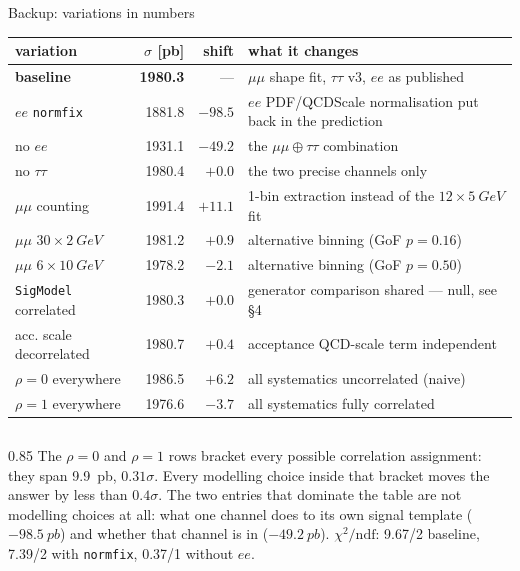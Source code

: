 \documentclass[aspectratio=169,9pt,t]{beamer}
\begin{document}
\begin{frame}[noframenumbering]{Backup: variations in numbers}
\centering\small
\begin{tabular}{@{}lrrl@{}}
\toprule
variation & $\sigma$ [pb] & shift & what it changes \\ \midrule
\textbf{baseline} & \textbf{1980.3} & --- & $\mu\mu$ shape fit, $\tau\tau$ v3, $ee$ as published \\
\alert{$ee$ \texttt{normfix}} & \alert{1881.8} & \alert{$-98.5$} & \alert{$ee$ PDF/QCDScale normalisation put back in the prediction} \\
no $ee$ & 1931.1 & $-49.2$ & the $\mu\mu \oplus \tau\tau$ combination \\
no $\tau\tau$ & 1980.4 & $+0.0$ & the two precise channels only \\
$\mu\mu$ counting & 1991.4 & $+11.1$ & 1-bin extraction instead of the $12\times\SI{5}{GeV}$ fit \\
$\mu\mu$ $30\times\SI{2}{GeV}$ & 1981.2 & $+0.9$ & alternative binning (GoF $p = 0.16$) \\
$\mu\mu$ $6\times\SI{10}{GeV}$ & 1978.2 & $-2.1$ & alternative binning (GoF $p = 0.50$) \\
\texttt{SigModel} correlated & 1980.3 & $+0.0$ & generator comparison shared --- null, see \S4 \\
acc. scale decorrelated & 1980.7 & $+0.4$ & acceptance QCD-scale term independent \\
$\rho = 0$ everywhere & 1986.5 & $+6.2$ & all systematics uncorrelated (naive) \\
$\rho = 1$ everywhere & 1976.6 & $-3.7$ & all systematics fully correlated \\
\bottomrule
\end{tabular}

\vspace{4mm}
\begin{columns}
\begin{column}{0.85\textwidth}\footnotesize
The $\rho = 0$ and $\rho = 1$ rows bracket every possible correlation assignment: they span
\SI{9.9}{pb}, $0.31\sigma$. Every modelling choice inside that bracket moves the answer by less
than $0.4\sigma$. The two entries that dominate the table are not modelling choices at all: what
one channel does to its own signal template ($-\SI{98.5}{pb}$) and whether that channel is in
($-\SI{49.2}{pb}$). $\chi^{2}/\mathrm{ndf}$: 9.67/2 baseline, 7.39/2 with \texttt{normfix},
0.37/1 without $ee$.
\end{column}
\end{columns}
\end{frame}
\end{document}
